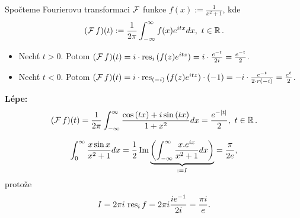 \begin{example}
Spočteme Fourierovu transformaci $\operatorname{\mathcal{F}} $ funkce $f(x):=\frac{1}{x^2+1}$, kde
$$(\F f)(t):=\frac{1}{2\pi}\int_{-\infty}^\infty{f(x)e^{itx}}dx, \ t\in\Real. $$
\begin{itemize}
    \item Nechť $t>0$. Potom $(\operatorname{\mathcal{F}} f)(t)=i\cdot\operatorname{res}_i{(f(z)e^{itz})}=i\cdot\frac{e^{-t}}{2i}=\frac{e^{-t}}{2}$.
    \item Nechť $t<0$. Potom $(\operatorname{\mathcal{F}} f)(t)=i\cdot\operatorname{res}_{(-i)}{(f(z)e^{itz})}\cdot(-1)=-i\cdot\frac{e^{-t}}{2\cdot  r(-i)}=\frac{e^{t}}{2}$.
\end{itemize}
\textbf{Lépe:}
$$(\operatorname{\mathcal{F}} f)(t)=\frac{1}{2\pi}\int_{-\infty}^\infty\frac{\cos{(tx)}+i\sin{(tx)}}{1+x^2}dx=\frac{e^{-|t|}}{2}, \ t\in\operatorname{\mathbb{R}} .$$
\end{example}

\begin{example}
$$\int_0^\infty\frac{x\sin{x}}{x^2+1}dx=\frac{1}{2}\operatorname{Im} \underset{:=I}{\underbrace{\left(\int_{-\infty}^\infty\frac{x.e^{ix}}{x^2+1}dx\right)}}=\frac{\pi}{2e},$$
protože
$$I=2\pi i\,\operatorname{res}_{i}{f}=2\pi i \frac{ie^{-1}}{2i}=\frac{\pi i}{e}.$$
\end{example}